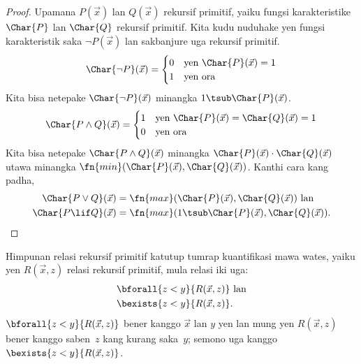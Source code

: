 \documentclass[../../../include/open-logic-section]{subfiles}
\begin{document}
\begin{proof}
  Upamana $P(\vec x)$ lan $Q(\vec x)$ rekursif primitif,
  yaiku fungsi karakteristike $\Char{P}$ lan $\Char{Q}$
  rekursif primitif. Kita kudu nuduhake yen fungsi
  karakteristik saka $\lnot P(\vec x)$ lan sakbanjure
  uga rekursif primitif.
  \[
  \Char{\lnot P}(\vec x) = \begin{cases}
    0 & \text{yen $\Char{P}(\vec x) = 1$}\\
    1 & \text{yen ora}
  \end{cases}
  \]
  Kita bisa netepake $\Char{\lnot P}(\vec x)$ minangka
  $1 \tsub \Char{P}(\vec x)$.
  \[
  \Char{P \land Q}(\vec x) = \begin{cases}
    1 & \text{yen $\Char{P}(\vec x) = \Char{Q}(\vec x) = 1$}\\
    0 & \text{yen ora}
  \end{cases}
  \]
  Kita bisa netepake $\Char{P \land Q}(\vec x)$ minangka
  $\Char{P}(\vec x) \cdot
  \Char{Q}(\vec x)$ utawa minangka $\fn{min}(\Char{P}(\vec x), \Char{Q}(\vec
  x))$. Kanthi cara kang padha,
  \begin{align*}
    \Char{P \lor Q}(\vec x) & = \fn{max}(\Char{P}(\vec x), \Char{Q}(\vec x)) \text{ lan}\\
    \Char{P \lif Q}(\vec x) & = \fn{max}(1 \tsub
  \Char{P}(\vec x), \Char{Q}(\vec x)).
  \end{align*}
\end{proof}

\begin{prop}
  Himpunan relasi rekursif primitif katutup tumrap
  kuantifikasi mawa wates, yaiku yen $R(\vec x, z)$
  relasi rekursif primitif, mula relasi iki uga:
  \begin{align*}
    & \bforall{z < y}{R(\vec x, z)} \text{ lan}\\
    & \bexists{z < y}{R(\vec x, z)}.
  \end{align*}
  $\bforall{z < y}{R(\vec x, z)}$ bener kanggo $\vec x$
  lan $y$ yen lan mung yen $R(\vec x, z)$ bener kanggo
  saben~$z$ kang kurang saka~$y$; semono uga kanggo
  $\bexists{z < y}{R(\vec x, z)}$.
\end{prop}
\end{document}
